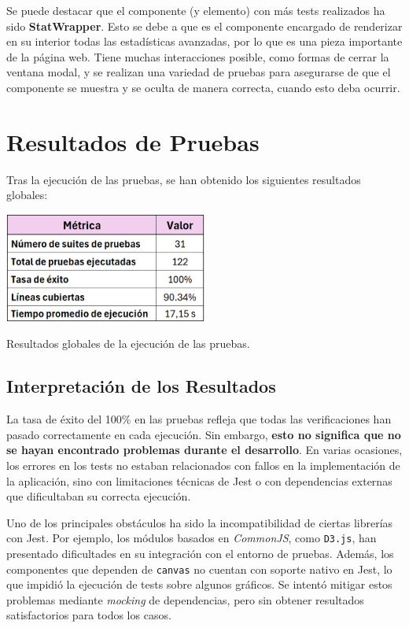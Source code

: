 Se puede destacar que el componente (y elemento) con más tests realizados ha sido \textbf{StatWrapper}. Esto se debe a que es el componente encargado de renderizar en su interior todas las estadísticas avanzadas, por lo que es una pieza importante de la página web. Tiene muchas interacciones posible, como formas de cerrar la ventana modal, y se realizan una variedad de pruebas para asegurarse de que el componente se muestra y se oculta de manera correcta, cuando esto deba ocurrir.

\newpage

\section{Resultados de Pruebas}

Tras la ejecución de las pruebas, se han obtenido los siguientes resultados globales:

\begin{table}[H]
    \centering
    \includegraphics[width=0.5\textwidth]{figures/resultado_tests.png}
    \captionsetup{skip=7pt}
    \caption{Resultados globales de la ejecución de las pruebas.}
    \label{tab:resultado_tests}
\end{table}

\subsection{Interpretación de los Resultados}

La tasa de éxito del 100\% en las pruebas refleja que todas las verificaciones han pasado correctamente en cada ejecución. Sin embargo, \textbf{esto no significa que no se hayan encontrado problemas durante el desarrollo}. En varias ocasiones, los errores en los tests no estaban relacionados con fallos en la implementación de la aplicación, sino con limitaciones técnicas de Jest o con dependencias externas que dificultaban su correcta ejecución.

Uno de los principales obstáculos ha sido la incompatibilidad de ciertas librerías con Jest. Por ejemplo, los módulos basados en \textit{CommonJS}, como \texttt{D3.js}, han presentado dificultades en su integración con el entorno de pruebas. Además, los componentes que dependen de \texttt{canvas} no cuentan con soporte nativo en Jest, lo que impidió la ejecución de tests sobre algunos gráficos. Se intentó mitigar estos problemas mediante \textit{mocking} de dependencias, pero sin obtener resultados satisfactorios para todos los casos.


